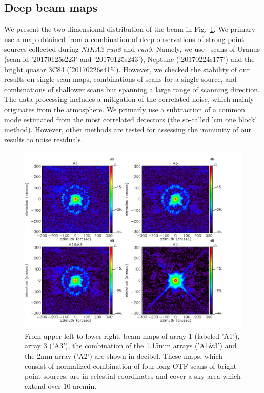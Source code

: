 \subsection{Deep beam maps}
\label{se:deep_beam_maps}
We present the two-dimensional distribution of the beam in
Fig.~\ref{fig:beam}. We primary use a map obtained from a combination
of deep observations of strong point sources collected during
\emph{NIKA2-run8} and \emph{run9}. Namely, we use \bm\ scans
of Uranus (scan id '20170125s223' and '20170125s243'),  Neptune
('20170224s177') and the bright quasar 3C84 ('20170226s415'). However,
we checked the stability of our results on single scan maps,
combinations of scans for a single source, and combinations of
shallower scans but spanning a large range of scanning direction. The
data processing includes a mitigation of the correlated noise, which
mainly originates from the atmosphere.  We primarly use a subtraction
of a common mode estimated from the most correlated detectors (the
so-called 'cm one block' method). However, other methods are tested
for assessing the immunity of our results to noise residuals.

\begin{figure}[ht!]
\begin{center}
  \includegraphics[clip, angle=0, scale=0.4]{Figures/Lobe_map_Combo_v2_dB.pdf}
 \caption[Beam pattern.]{From upper left to lower right, beam maps of array 1 (labeled 'A1'), array 3 ('A3'), the combination of the 1.15mm arrays ('A1$\&$3') and the 2mm array ('A2') are shown in decibel. These maps, which consist of normalized combination of four long OTF scans of bright point sources, are in celestial coordinates and cover a sky area which extend over 10 arcmin.}
\label{fig:beam}
\end{center}
\end{figure}


